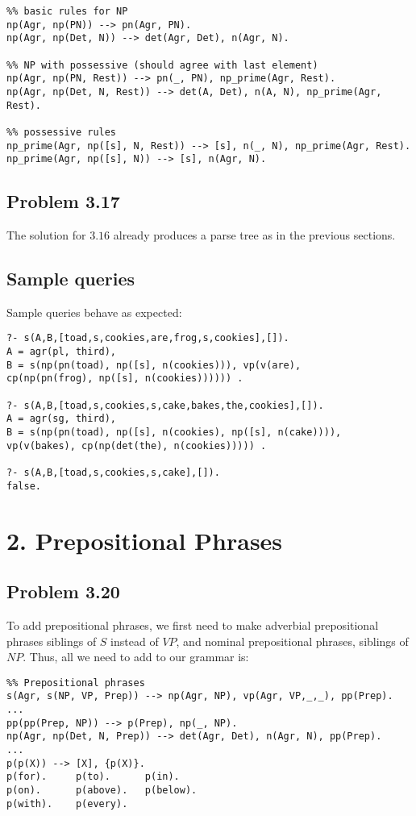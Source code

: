 \documentclass[12pt]{article}
\makeatletter
\newenvironment{problem x}{\@startsection
       {section}
       {1}
       {-.2em}
       {-3.5ex plus -1ex minus -.2ex}
       {2.3ex plus .2ex}
       {\pagebreak[3] %
       \large\bf\noindent{Problem }
       }
       }
       {%
       \begin{center}\large\bf \ldots\ldots\ldots\end{center}}
\makeatother
\begin{document}
    \begin{verbatim}
%% basic rules for NP
np(Agr, np(PN)) --> pn(Agr, PN).
np(Agr, np(Det, N)) --> det(Agr, Det), n(Agr, N).

%% NP with possessive (should agree with last element)
np(Agr, np(PN, Rest)) --> pn(_, PN), np_prime(Agr, Rest).
np(Agr, np(Det, N, Rest)) --> det(A, Det), n(A, N), np_prime(Agr, Rest).

%% possessive rules
np_prime(Agr, np([s], N, Rest)) --> [s], n(_, N), np_prime(Agr, Rest).
np_prime(Agr, np([s], N)) --> [s], n(Agr, N).
    \end{verbatim}

  \subsection*{Problem 3.17}

    The solution for $3.16$ already produces a parse tree as in the previous sections.

  \subsection*{Sample queries}

  Sample queries behave as expected:
  \begin{verbatim}
?- s(A,B,[toad,s,cookies,are,frog,s,cookies],[]).
A = agr(pl, third),
B = s(np(pn(toad), np([s], n(cookies))), vp(v(are),
cp(np(pn(frog), np([s], n(cookies)))))) .

?- s(A,B,[toad,s,cookies,s,cake,bakes,the,cookies],[]).
A = agr(sg, third),
B = s(np(pn(toad), np([s], n(cookies), np([s], n(cake)))),
vp(v(bakes), cp(np(det(the), n(cookies))))) .

?- s(A,B,[toad,s,cookies,s,cake],[]).
false.
  \end{verbatim}

  \newpage
  \section*{2. Prepositional Phrases}
    \subsection*{Problem 3.20}
      To add prepositional phrases, we first need to make adverbial prepositional phrases siblings of $S$ instead of $VP$, and nominal prepositional phrases, siblings of $NP$. Thus, all we need to add to our grammar is:

    \begin{verbatim}
%% Prepositional phrases
s(Agr, s(NP, VP, Prep)) --> np(Agr, NP), vp(Agr, VP,_,_), pp(Prep).
...
pp(pp(Prep, NP)) --> p(Prep), np(_, NP).
np(Agr, np(Det, N, Prep)) --> det(Agr, Det), n(Agr, N), pp(Prep).
...
p(p(X)) --> [X], {p(X)}.
p(for).     p(to).      p(in).
p(on).      p(above).   p(below).
p(with).    p(every).
    \end{verbatim}
\end{document}
